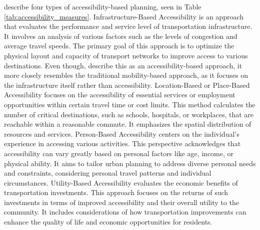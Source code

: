  describe four types of accessibility-based planning, seen in Table \ref{tab:accessibility_measures}.
Infrastructure-Based Accessibility is an approach that evaluates the performance and service level of transportation infrastructure.
It involves an analysis of various factors such as the levels of congestion and average travel speeds. 
The primary goal of this approach is to optimize the physical layout and capacity of transport networks to improve access to various destinations.
Even though,  describe this as an accessibility-based approach, it more closely resembles the traditional mobility-based approach, as it focuses on the infrastructure itself rather than accessibility.
Location-Based or Place-Based Accessibility focuses on the accessibility of essential services or employment opportunities within certain travel time or cost limits. 
This method calculates the number of critical destinations, such as schools, hospitals, or workplaces, that are reachable within a reasonable commute. It emphasizes the spatial distribution of resources and services.
Person-Based Accessibility centers on the individual’s experience in accessing various activities. This perspective acknowledges that accessibility can vary greatly based on personal factors like age, income, or physical ability. It aims to tailor urban planning to address diverse personal needs and constraints, considering personal travel patterns and individual circumstances.
Utility-Based Accessibility evaluates the economic benefits of transportation investments. 
This approach focuses on the returns of such investments in terms of improved accessibility and their overall utility to the community. 
It includes considerations of how transportation improvements can enhance the quality of life and economic opportunities for residents.

